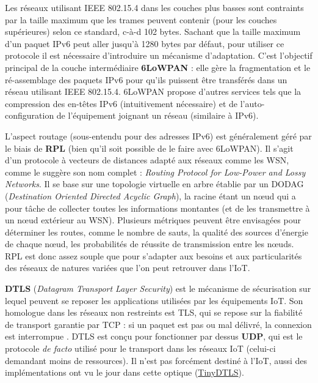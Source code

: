 \documentclass[]{article}
\begin{document}
\par Les réseaux utilisant IEEE 802.15.4 dans les couches plus basses sont contraints par la taille maximum que les trames peuvent contenir (pour les couches supérieures) selon ce standard, c-à-d 102 bytes. Sachant que la taille maximum d'un paquet IPv6 peut aller jusqu'à 1280 bytes par défaut, pour utiliser ce protocole il est nécessaire d'introduire un mécanisme d'adaptation. C'est l'objectif principal de la couche intermédiaire \textbf{6LoWPAN} : elle gère la fragmentation et le ré-assemblage des paquets IPv6 pour qu'ils puissent être transférés dans un réseau utilisant IEEE 802.15.4. 6LoWPAN propose d'autres services tels que la compression des en-têtes IPv6 (intuitivement nécessaire) et de l'auto-configuration de l'équipement joignant un réseau (similaire à IPv6).\\

\par L'aspect routage (sous-entendu pour des adresses IPv6) est généralement géré par le biais de \textbf{RPL} (bien qu'il soit possible de le faire avec 6LoWPAN). Il s'agit d'un protocole à vecteurs de distances adapté aux réseaux comme les WSN, comme le suggère son nom complet : \textit{Routing Protocol for Low-Power and Lossy Networks}. Il se base sur une topologie virtuelle en arbre établie par un DODAG (\textit{Destination Oriented Directed Acyclic Graph}), la racine étant un nœud qui a pour tâche de collecter toutes les informations montantes (et de les transmettre à un nœud extérieur au WSN). Plusieurs métriques peuvent être envisagées pour déterminer les routes, comme le nombre de sauts, la qualité des sources d'énergie de chaque nœud, les probabilités de réussite de transmission entre les nœuds. RPL est donc assez souple que pour s'adapter aux besoins et aux particularités des réseaux de natures variées que l'on peut retrouver dans l'IoT.\\

\par \textbf{DTLS} (\textit{Datagram Transport Layer Security}) est le mécanisme de sécurisation sur lequel peuvent se reposer les applications utilisées par les équipements IoT. Son homologue dans les réseaux non restreints est TLS, qui se repose sur la fiabilité de transport garantie par TCP : si un paquet est pas ou mal délivré, la connexion est interrompue \cite{Lakkundi2014}. DTLS est conçu pour fonctionner par dessus \textbf{UDP}, qui est le protocole \textit{de facto} utilisé pour le transport dans les réseaux IoT (celui-ci demandant moins de ressources). Il n'est pas forcément destiné à l'IoT, aussi des implémentations ont vu le jour dans cette optique (\href{https://projects.eclipse.org/proposals/tinydtls}{TinyDTLS}).\\
\end{document}
